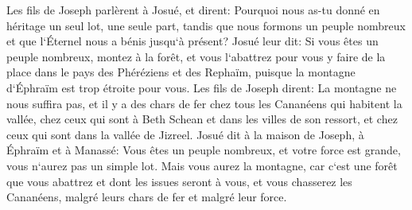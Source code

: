 \verse Les fils de Joseph parlèrent à Josué, et dirent: Pourquoi nous as-tu donné en héritage un seul lot, une seule part, tandis que nous formons un peuple nombreux et que l`Éternel nous a bénis jusqu`à présent? 
\verse Josué leur dit: Si vous êtes un peuple nombreux, montez à la forêt, et vous l`abattrez pour vous y faire de la place dans le pays des Phéréziens et des Rephaïm, puisque la montagne d`Éphraïm est trop étroite pour vous. 
\verse Les fils de Joseph dirent: La montagne ne nous suffira pas, et il y a des chars de fer chez tous les Cananéens qui habitent la vallée, chez ceux qui sont à Beth Schean et dans les villes de son ressort, et chez ceux qui sont dans la vallée de Jizreel. 
\verse Josué dit à la maison de Joseph, à Éphraïm et à Manassé: Vous êtes un peuple nombreux, et votre force est grande, vous n`aurez pas un simple lot. 
\verse Mais vous aurez la montagne, car c`est une forêt que vous abattrez et dont les issues seront à vous, et vous chasserez les Cananéens, malgré leurs chars de fer et malgré leur force. 

